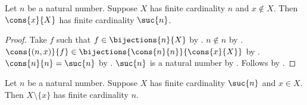 \begin{proposition}\label{finite_cardinality_cons}
    Let $n$ be a natural number.
    Suppose $X$ has finite cardinality $n$ and $x\notin X$.
    Then $\cons{x}{X}$ has finite cardinality $\suc{n}$.
\end{proposition}
\begin{proof}
    Take $f$ such that $f\in\bijections{n}{X}$ by
        .
    $n\notin n$ by .
    $\cons{(n,x)}{f}\in
        \bijections{\cons{n}{n}}{\cons{x}{X}}$ by
        .
    $\cons{n}{n}=\suc{n}$ by .
    $\suc{n}$ is a natural number by .
    Follows by .
\end{proof}

\begin{proposition}\label{finite_cardinality_remove_element}
    Let $n$ be a natural number.
    Suppose $X$ has finite cardinality $\suc{n}$ and $x\in X$.
    Then $X\setminus\{x\}$ has finite cardinality $n$.
\end{proposition}

